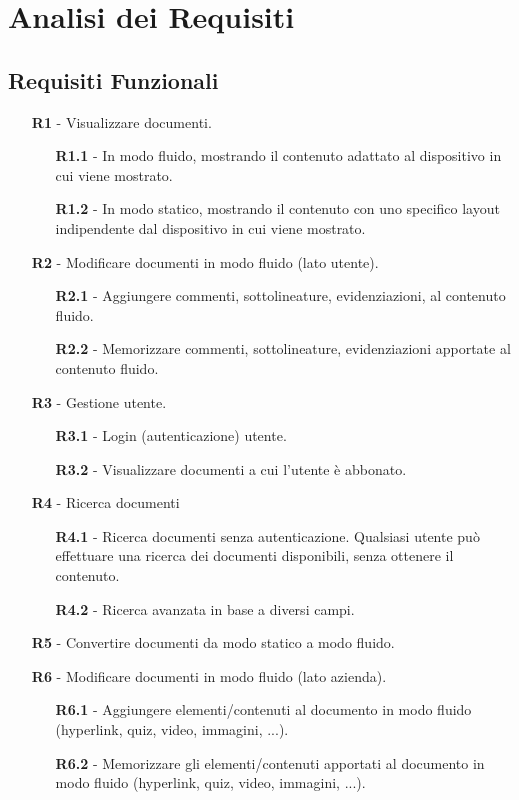 \section{Analisi dei Requisiti}
\subsection{Requisiti Funzionali}
\begin{itemize}
    \item[\textbf{R1}] - Visualizzare documenti.
    \begin{itemize}
        \item[\textbf{R1.1}] - In modo fluido, mostrando il contenuto adattato al dispositivo in cui viene mostrato.
        \item[\textbf{R1.2}] - In modo statico, mostrando il contenuto con uno specifico layout indipendente dal dispositivo in cui viene mostrato.
    \end{itemize}
    \item[\textbf{R2}] - Modificare documenti in modo fluido (lato utente).
    \begin{itemize}
        \item[\textbf{R2.1}] - Aggiungere commenti, sottolineature, evidenziazioni, al contenuto fluido.
        \item[\textbf{R2.2}] - Memorizzare commenti, sottolineature, evidenziazioni apportate al contenuto fluido.
    \end{itemize}
    \item[\textbf{R3}] - Gestione utente.
    \begin{itemize}
        \item[\textbf{R3.1}] - Login (autenticazione) utente.
        \item[\textbf{R3.2}] - Visualizzare documenti a cui l'utente è abbonato.
    \end{itemize}
    \item[\textbf{R4}] - Ricerca documenti
    \begin{itemize}
        \item[\textbf{R4.1}] - Ricerca documenti senza autenticazione. Qualsiasi utente può effettuare una ricerca dei documenti disponibili, senza ottenere il contenuto.
        \item[\textbf{R4.2}] - Ricerca avanzata in base a diversi campi. %
    \end{itemize}
    \item[\textbf{R5}] - Convertire documenti da modo statico a modo fluido.
    \item[\textbf{R6}] - Modificare documenti in modo fluido (lato azienda).
    \begin{itemize}
        \item[\textbf{R6.1}] - Aggiungere elementi/contenuti al documento in modo fluido (hyperlink, quiz, video, immagini, ...). %
        \item[\textbf{R6.2}] - Memorizzare gli elementi/contenuti apportati al documento in modo fluido (hyperlink, quiz, video, immagini, ...).
    \end{itemize}
\end{itemize}

